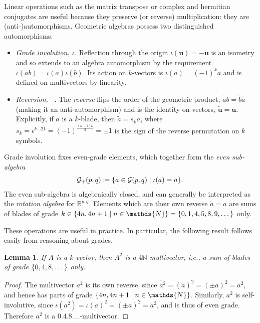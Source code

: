 \documentclass[12pt,a4paper]{article}
\newtheorem{lemma}{Lemma}
\renewcommand{\vb}[1]{\boldsymbol{#1}}
\newcommand{\GA}[1][]{\mathcal{G}_{#1}}
\newcommand{\rev}[1]{\widetilde{#1}}
\newcommand{\RR}{\mathds{R}}
\newcommand{\NN}{\mathds{N}}
\begin{document}
Linear operations such as the matrix transpose or complex and hermitian conjugates are useful because they preserve (or reverse) multiplication: they are (anti-)auto\-morphisms.
Geometric algebras possess two distinguished automorphisms:
\begin{itemize}
	\item \emph{Grade involution, $\iota{}$.}
	Reflection through the origin $\iota{}(\vb{u}) = -\vb{u}$ is an isometry and so extends to an algebra automorphism by the requirement $\iota{}(ab) = \iota{}(a)\iota{}(b)$.
	Its action on $k$-vectors is
	\begin{math}
		\iota{}(a) = (-1)^ka
	\end{math}
	and is defined on multivectors by linearity.

	\item \emph{Reversion, $\rev{\phantom{a}}$.}
	The \emph{reverse} flips the order of the geometric product,
	\begin{math}
		\rev{ab} = \rev{b}\rev{a}
	\end{math}
	(making it an anti-automorphism) and is the identity on vectors, $\rev{\vb{u}{}} = \vb{u}{}$.
	Explicitly, if $a$ is a $k$-blade, then $\rev{a} = s_ka$, where $s_k = \epsilon{}^{k\cdots 21} = (-1)^{\frac{(k - 1)k}2} = \pm1$ is the sign of the reverse permutation on $k$ symbols.
\end{itemize}
Grade involution fixes even-grade elements, which together form the \emph{even sub-algebra}
\begin{align}
	\GA[+](p, q) \coloneqq \qty{a \in \GA(p, q) \mid \iota{}(a) = a}
.\end{align}
The even sub-algebra is algebraically closed, and can generally be interpreted as the \emph{rotation algebra} for $\RR^{p,q}$.
Elements which are their own reverse $\rev{a} = a$ are sums of blades of grade $k \in \qty{4n, 4n + 1 \mid n \in \NN} = \qty{0, 1, 4, 5, 8, 9, \dots}$ only.

These operations are useful in practice.
In particular, the following result follows easily from reasoning about grades.
\begin{lemma}
	\label{lem:grades-of-square}
	If $A$ is a $k$-vector, then $A^2$ is a $4\NN$-multivector, \emph{i.e.}, a sum of blades of grade $\qty{0, 4, 8, \dots}$ only.
\end{lemma}
\begin{proof}
	The multivector $a^2$ is its own reverse, since $\rev{a^2} = (\rev{a})^2 = (\pm a)^2 = a^2$, and hence has parts of grade $\qty{4n, 4n + 1 \mid n \in \NN}$.
	Similarly, $a^2$ is self-involutive, since $\iota{}(a^2) = \iota{}(a)^2 = (\pm a)^2 = a^2$, and is thus of even grade.
	Therefore $a^2$ is a $\qty{0, 4, 8, ...}$-multivector.
\end{proof}
\end{document}
